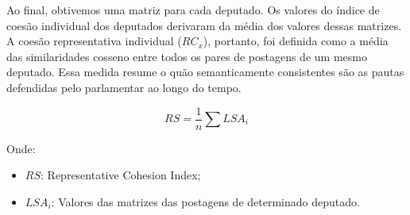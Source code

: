 Ao final, obtivemos uma matriz para cada deputado. Os valores do índice de coesão individual dos deputados derivaram da média dos valores dessas matrizes. A coesão representativa individual ($RC_x$), portanto, foi definida como a média das similaridades cosseno entre todos os pares de postagens de um mesmo deputado. Essa medida resume o quão semanticamente consistentes são as pautas defendidas pelo parlamentar ao longo do tempo.

\begin{equation}
RS = \frac{1}{n} \sum LSA_i
\end{equation}

Onde:
\begin{itemize}
    \item $RS$: Representative Cohesion Index;
    \item $LSA_i$: Valores das matrizes das postagens de determinado deputado.
\end{itemize}

